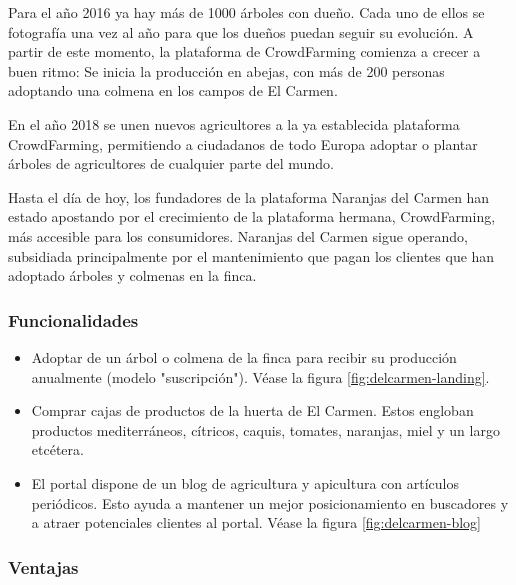 Para el año 2016 ya hay más de 1000 árboles con dueño. Cada uno de ellos se fotografía una vez al año para que los dueños puedan seguir su evolución. A partir de este momento, la plataforma de CrowdFarming comienza a crecer a buen ritmo: Se inicia la producción en abejas, con más de 200 personas adoptando una colmena en los campos de El Carmen.

En el año 2018 se unen nuevos agricultores a la ya establecida plataforma CrowdFarming, permitiendo a ciudadanos de todo Europa adoptar o plantar árboles de agricultores de cualquier parte del mundo.

Hasta el día de hoy, los fundadores de la plataforma Naranjas del Carmen han estado apostando por el crecimiento de la plataforma hermana, CrowdFarming, más accesible para los consumidores. Naranjas del Carmen sigue operando, subsidiada principalmente por el mantenimiento que pagan los clientes que han adoptado árboles y colmenas en la finca.

\subsubsection{Funcionalidades}

\begin{itemize}

	\item Adoptar de un árbol o colmena de la finca para recibir su producción anualmente (modelo "suscripción"). Véase la figura \ref{fig:delcarmen-landing}.

	\item Comprar cajas de productos de la huerta de El Carmen. Estos engloban productos mediterráneos, cítricos, caquis, tomates, naranjas, miel y un largo etcétera.

	\item El portal dispone de un blog de agricultura y apicultura con artículos periódicos. Esto ayuda a mantener un mejor posicionamiento en buscadores y a atraer potenciales clientes al portal. Véase la figura \ref{fig:delcarmen-blog}

\end{itemize}


\subsubsection{Ventajas}

